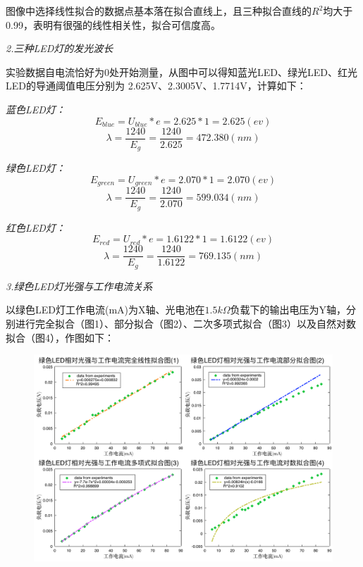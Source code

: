 \documentclass[UTF8]{ctexart}
\begin{document}
    图像中选择线性拟合的数据点基本落在拟合直线上，且三种拟合直线的$R^2$均大于0.99，表明有很强的线性相关性，拟合可信度高。

    \begin{center}
    \emph{2.三种LED灯的发光波长}
    \end{center}

    实验数据自电流恰好为0处开始测量，从图中可以得知蓝光LED、绿光LED、红光LED的导通阈值电压分别为
    2.625V、2.3005V、1.7714V，计算如下：
    
    \emph{蓝色LED灯：}
    \begin{equation*}
        E_{blue}=U_{blue}*e=2.625*1=2.625(ev)
    \end{equation*}
    \begin{equation*}
        \lambda =\frac{1240}{E_g}=\frac{1240}{2.625}=472.380(nm)
    \end{equation*}

    \emph{绿色LED灯：}
    \begin{equation*}
        E_{green}=U_{green}*e=2.070*1=2.070(ev)
    \end{equation*}
    \begin{equation*}
        \lambda =\frac{1240}{E_g}=\frac{1240}{2.070}=599.034(nm)
    \end{equation*}

    \emph{红色LED灯：}
    \begin{equation*}
        E_{red}=U_{red}*e=1.6122*1=1.6122(ev)
    \end{equation*}
    \begin{equation*}
        \lambda =\frac{1240}{E_g}=\frac{1240}{1.6122}=769.135(nm)
    \end{equation*}

    \begin{center}
    \emph{3.绿色LED灯光强与工作电流关系}
    \end{center}

    以绿色LED灯工作电流(mA)为X轴、光电池在$1.5k\varOmega $负载下的输出电压为Y轴，分别进行完全拟合（图1）、部分拟合（图2）、二次多项式拟合（图3）以及自然对数拟合（图4），作图如下：
    \begin{figure}[ht]
        \centering 
        \includegraphics[width=16cm]{zhengque.pdf}
    \end{figure}
\end{document}
